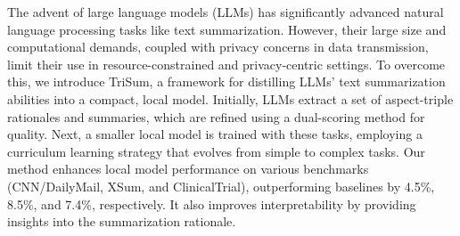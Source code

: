 The advent of large language models (LLMs) has significantly advanced natural language processing tasks like text summarization. However, their large size and computational demands, coupled with privacy concerns in data transmission, limit their use in resource-constrained and privacy-centric settings. To overcome this, we introduce TriSum, a framework for distilling LLMs' text summarization abilities into a compact, local model. Initially, LLMs extract a set of aspect-triple rationales and summaries, which are refined using a dual-scoring method for quality. Next, a smaller local model is trained with these tasks, employing a curriculum learning strategy that evolves from simple to complex tasks. Our method enhances local model performance on various benchmarks (CNN/DailyMail, XSum, and ClinicalTrial), outperforming baselines by 4.5\%, 8.5\%, and 7.4\%, respectively. It also improves interpretability by providing insights into the summarization rationale.